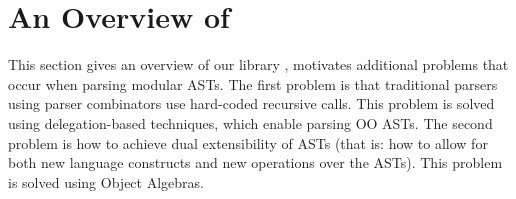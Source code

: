 \section{An Overview of \name}\label{sec:overview}

This section gives an overview of our library \name, motivates
additional problems that occur when parsing modular ASTs.  The first
problem is that traditional parsers using parser combinators use
hard-coded recursive calls. This problem is solved using
delegation-based techniques, which enable parsing OO ASTs.  The second
problem is how to achieve dual extensibility of ASTs (that is: how to
allow for both new language constructs and new operations over the
ASTs). This problem is solved using Object Algebras.

\begin{comment}
Basically, \name consists of four parts: underlying parsing technique, delegation mechanism encoded by open recursion, Object Algebras, and glue code of new combinators and utility functions. We start from Section \ref{subsec:overview-parsing}, which discusses the choice of parsing technique and how it affects modularity of parsers. Section \ref{subsec:overview-problem} demonstrates the goal of extending parsers together with ASTs in a semantic modular way, with both separate compilation and type-safe code reuse. Then we will see traditional parser combinators fail to achieve it because of hard-coded recursive calls. In Section \ref{subsec:overview-delegation}, we show how delegation can solve this problem and allow us to build extensible parsers. Finally, Section \ref{subsec:overview-oa} gives examples of using Object Algebras for more extensibility, including extension of operations and parsing multiple sorts of syntax.\haoyuan{TODO}
\end{comment}

